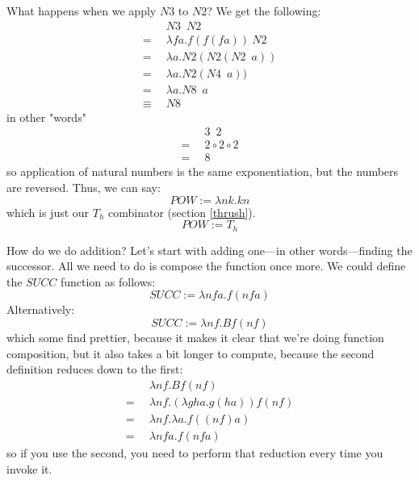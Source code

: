 \documentclass[11pt]{article}
\begin{document}
What happens when we apply \(N3\) to \(N2\)? We get the following:
\begin{align*}
	&N3\enspace N2\\
	=\enspace&\lambda fa.f(f(fa))\:N2\\
	=\enspace&\lambda a.N2(N2(N2\enspace a))\\
	=\enspace&\lambda a.N2(N4\enspace a))\\
	=\enspace&\lambda a.N8\enspace a\\
	\equiv\enspace&N8
\end{align*}
in other "words"
\begin{align*}
	&3\enspace2\\
	=\enspace&2\circ2\circ2\\
	=\enspace&8
\end{align*}
so application of natural numbers is the same exponentiation, but the numbers
are reversed. Thus, we can say:
\[POW:=\lambda nk.kn\]
which is just our \(T_{h}\) combinator (section \ref{thrush}).
\[POW:=T_{h}\]

How do we do addition? Let's start with adding one---in other words---finding
the successor. All we need to do is compose the function once more. We could
define the \(SUCC\) function as follows:
\[SUCC:=\lambda nfa.f(nfa)\]
Alternatively:
\[SUCC:=\lambda nf.Bf(nf)\]
which some find prettier, because it makes it clear that we're doing function
composition, but it also takes a bit longer to compute, because the second
definition reduces down to the first:
\begin{align*}
	&\lambda nf.Bf(nf)\\
	=\enspace&\lambda nf.(\lambda gha.g(ha))f(nf)\\
	=\enspace&\lambda nf.\lambda a.f((nf)a)\\
	=\enspace&\lambda nfa.f(nfa)
\end{align*}
so if you use the second, you need to perform that reduction every time you
invoke it.
\end{document}
